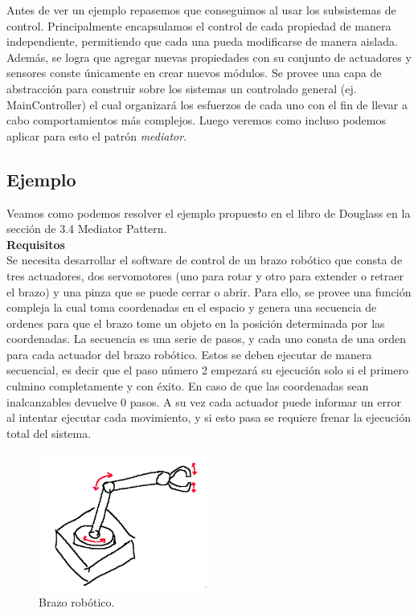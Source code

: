 Antes de ver un ejemplo repasemos que conseguimos al usar los subsistemas de control. Principalmente encapsulamos el control de cada propiedad de manera independiente, permitiendo que cada una pueda modificarse de manera aislada. Además, se logra que agregar nuevas propiedades con su conjunto de actuadores y sensores conste únicamente en crear nuevos módulos. Se provee una capa de abstracción para construir sobre los sistemas un controlado general (ej. MainController) el cual organizará los esfuerzos de cada uno con el fin de llevar a cabo comportamientos más complejos. Luego veremos como incluso podemos aplicar para esto el patrón \textit{mediator}.

\subsection{Ejemplo}

Veamos como podemos resolver el ejemplo propuesto en el libro de Douglass\cite{douglass} en la sección de 3.4 Mediator Pattern.
\\
\noident
\textbf{Requisitos}
\\
\noident
Se necesita desarrollar el software de control de un brazo robótico que consta de tres actuadores, dos servomotores (uno para rotar y otro para extender o retraer el brazo) y una pinza que se puede cerrar o abrir. Para ello, se provee una función compleja la cual toma coordenadas en el espacio y genera una secuencia de ordenes para que el brazo tome un objeto en la posición determinada por las coordenadas. La secuencia es una serie de pasos, y cada uno consta de una orden para cada actuador del brazo robótico. Estos se deben ejecutar de manera secuencial, es decir que el paso número 2 empezará su ejecución solo si el primero culmino completamente y con éxito. En caso de que las coordenadas sean inalcanzables devuelve 0 pasos. A su vez cada actuador puede informar un error al intentar ejecutar cada movimiento, y si esto pasa se requiere frenar la ejecución total del sistema.

\begin{figure}[h]
\caption{Brazo robótico.}
\begin{centering}
{\includegraphics[width=0.5\textwidth]{Screenshot from 2024-08-29 18-44-50.png}\par}
\end{centering}
\end{figure}

